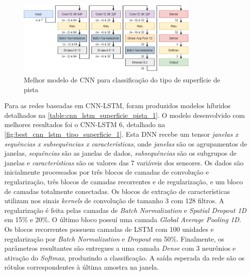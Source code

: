 
\begin{figure}[H]
  \centering
  \caption{Melhor modelo de CNN para classificação do tipo de superfície de pista}
  \label{fig:best_cnn_dnn_tipo_superficie_1}
  \includegraphics[width=0.8\textwidth]{figuras/fig_32.png}
\end{figure}

Para as redes baseadas em CNN-LSTM, foram produzidos modelos híbridos detalhados na \autoref{table:cnn_lstm_superficie_pista_1}. O modelo desenvolvido com melhores resultados foi o CNN-LSTM 6, detalhado na \autoref{fig:best_cnn_lstm_tipo_superficie_1}. Esta DNN recebe um tensor \emph{janelas x sequências x subsequências x características}, onde \emph{janelas} são os agrupamentos de janelas, \emph{sequências} são as janelas de dados, \emph{subsequências} são os subgrupos de janelas e \emph{características} são os valores das 7 variáveis dos sensores. Os dados são inicialmente processados por três blocos de camadas de convolução e regularização, três blocos de camadas recorrentes e de regularização, e um bloco de camadas totalmente conectadas. Os blocos de extração de características utilizam nos sinais \textit{kernels} de convolução de tamanho 3 com 128 filtros. A regularização é feita pelas camadas de \textit{Batch Normalization} e \textit{Spatial Dropout 1D} em 15\% e 20\%. O último bloco possuí uma camada \textit{Global Average Pooling 1D}. Os blocos recorrentes possuem camadas de LSTM com 100 unidades e regularização por \textit{Batch Normalization} e \textit{Dropout} em 50\%. Finalmente, os parâmetros resultantes são entregues a uma camada \textit{Dense} com 3 neurônios e ativação do \textit{Softmax}, produzindo a classificação. A saída esperada da rede são os rótulos correspondentes à última amostra na janela.

